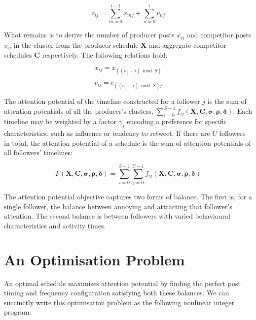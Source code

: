 \documentclass[onecolumn, 12 pt, doublespace, fullpage, letterpaper]{report}
\begin{document}
\begin{equation}
       z_{ij} = \sum_{m = 0}^{i - 1} x_{mj} + \sum_{n = 0}^{i} v_{nj}
\end{equation}

What remains is to derive the number of producer posts $x_{ij}$ and competitor posts $v_{ij}$ in the cluster from the producer schedule $\mathbf{X}$ and aggregate competitor schedules $\mathbf{C}$ respectively. The following relations hold:

\begin{equation}
  x_{ij} = x_{((\sigma_j - i)\bmod{S})} \label{eq:nomenclature-x}
\end{equation}

\begin{equation}
  v_{ij} = c_{((\sigma_j - i)\bmod{S})j} \label{eq:nomenclature-v}
\end{equation}

The attention potential of the timeline constructed for a follower $j$ is the sum of attention potentials of all the producer's clusters, $\sum_{i = 0}^{S-1} f_{ij}(\mathbf{X}, \mathbf{C}, \boldsymbol\sigma, \boldsymbol\rho, \boldsymbol\delta)$. Each timeline may be weighted by a factor $\gamma_j$ encoding a preference for specific characteristics, such as influence or tendency to retweet. If there are $U$ followers in total, the attention potential of a schedule is the sum of attention potentials of all followers' timelines:

\begin{equation}
  F(\mathbf{X}, \mathbf{C}, \boldsymbol\sigma, \boldsymbol\rho, \boldsymbol\delta) = \sum_{i=0}^{S-1} \sum_{j=0}^{U-1} f_{ij}(\mathbf{X}, \mathbf{C}, \boldsymbol\sigma, \boldsymbol\rho, \boldsymbol\delta)
\end{equation}

The attention potential objective captures two forms of balance. The first is, for a single follower, the balance between annoying and attracting that follower's attention. The second balance is between followers with varied behavioural characteristics and activity times.

\section{An Optimisation Problem}

An optimal schedule maximises attention potential by finding the perfect post timing and frequency configuration satisfying both these balances. We can succinctly write this optimisation problem as the following nonlinear integer program:
\end{document}
